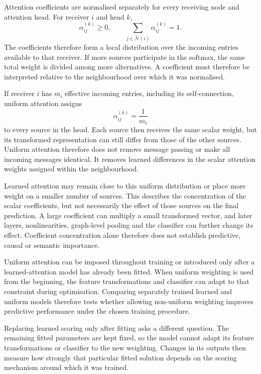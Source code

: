 \documentclass[11pt,a4paper]{article}
\begin{document}
Attention coefficients are normalised separately for every receiving node and attention head. For receiver \(i\) and head \(k\),
\[
\alpha_{ij}^{(k)}\geq 0,
\qquad
\sum_{j\in\widetilde{\mathcal{N}}(i)}
\alpha_{ij}^{(k)}
=
1.
\]
The coefficients therefore form a local distribution over the incoming entries available to that receiver. If more sources participate in the softmax, the same total weight is divided among more alternatives. A coefficient must therefore be interpreted relative to the neighbourhood over which it was normalised.

If receiver \(i\) has \(m_i\) effective incoming entries, including its self-connection, uniform attention assigns
\[
\alpha_{ij}^{(k)}
=
\frac{1}{m_i}
\]
to every source in the head. Each source then receives the same scalar weight, but its transformed representation can still differ from those of the other sources. Uniform attention therefore does not remove message passing or make all incoming messages identical. It removes learned differences in the scalar attention weights assigned within the neighbourhood.

Learned attention may remain close to this uniform distribution or place more weight on a smaller number of sources. This describes the concentration of the scalar coefficients, but not necessarily the effect of those sources on the final prediction. A large coefficient can multiply a small transformed vector, and later layers, nonlinearities, graph-level pooling and the classifier can further change its effect. Coefficient concentration alone therefore does not establish predictive, causal or semantic importance.

Uniform attention can be imposed throughout training or introduced only after a learned-attention model has already been fitted. When uniform weighting is used from the beginning, the feature transformations and classifier can adapt to that constraint during optimisation. Comparing separately trained learned and uniform models therefore tests whether allowing non-uniform weighting improves predictive performance under the chosen training procedure.

Replacing learned scoring only after fitting asks a different question. The remaining fitted parameters are kept fixed, so the model cannot adapt its feature transformations or classifier to the new weighting. Changes in its outputs then measure how strongly that particular fitted solution depends on the scoring mechanism around which it was trained.
\end{document}
